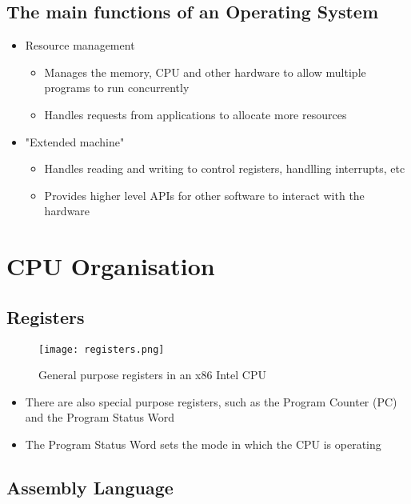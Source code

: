 \subsection*{The main functions of an Operating System}

\begin{itemize}
  \item Resource management
  \begin{itemize}
    \item Manages the memory, CPU and other hardware to allow multiple programs to run concurrently
    \item Handles requests from applications to allocate more resources
  \end{itemize}
  \item "Extended machine"
  \begin{itemize}
    \item Handles reading and writing to control registers, handlling interrupts, etc
    \item Provides higher level APIs for other software to interact with the hardware
  \end{itemize}
\end{itemize}

\section*{CPU Organisation}

\subsection*{Registers}

\begin{figure}[h]
  \centering
  \texttt{[image: registers.png]}
  \caption{General purpose registers in an x86 Intel CPU}
\end{figure}

\begin{itemize}
  \item There are also special purpose registers, such as the Program Counter (PC) and the Program Status Word
  \item The Program Status Word sets the mode in which the CPU is operating
\end{itemize}

\subsection*{Assembly Language}

